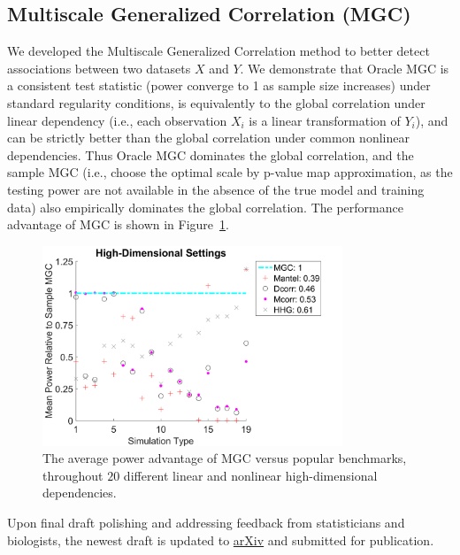 \documentclass[simplex.tex]{subfiles}
\begin{document}
\subsection{Multiscale Generalized Correlation (MGC)}

We developed the Multiscale Generalized Correlation method to better detect associations between two datasets $X$ and $Y$. We demonstrate that Oracle MGC is a consistent test statistic (power converge to 1 as sample size increases) under standard regularity conditions, is equivalently to the global correlation under linear dependency (i.e., each observation $X_i$ is a linear transformation of $Y_i$), and can be strictly better than the global correlation under common nonlinear dependencies. Thus Oracle MGC dominates the global correlation, and the sample MGC (i.e., choose the optimal scale by p-value map approximation, as the testing power are not available in the absence of the true model and training data) also empirically dominates the global correlation. The performance advantage of MGC is shown in Figure~\ref{fig:all}.
%
\begin{figure}[h!]
\begin{cframed}
		\centering
		\includegraphics[width=0.8\textwidth]{../../figs/FigHDPowerSummary}
    \caption{The average power advantage of MGC versus popular benchmarks, throughout $20$ different linear and nonlinear high-dimensional dependencies.}
		\label{fig:all}
		\end{cframed}
\end{figure}

Upon final draft polishing and addressing feedback from statisticians and biologists, the newest draft is updated to \href{https://arxiv.org/pdf/1609.05148.pdf}{arXiv} and submitted for publication. 

\clearpage
\end{document}
